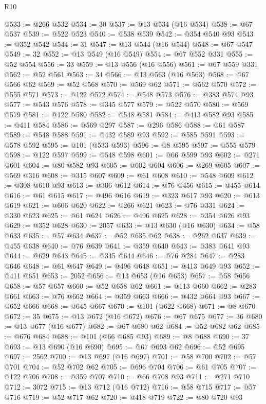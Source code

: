 \begin{lexlean}{R10}
\begin{coremodule}
@533 := @266 @532
@534 := 30
@537 := @13 @534 (@16 @534)
@538 := @67 @537
@539 := @522 @523
@540 := @538 @539
@542 := @354 @540 @93
@543 := @352 @542
@544 := 31
@547 := @13 @544 (@16 @544)
@548 := @67 @547
@549 := 32
@552 := @13 @549 (@16 @549)
@554 := @67 @552 @331
@555 := @52 @554
@556 := 33
@559 := @13 @556 (@16 @556)
@561 := @67 @559 @331
@562 := @52 @561
@563 := 34
@566 := @13 @563 (@16 @563)
@568 := @67 @566 @62
@569 := @52 @568
@570 := @569 @62
@571 := @562 @570
@572 := @555 @571
@573 := @122 @572
@574 := @548 @573
@576 := @383 @574 @93
@577 := @543 @576
@578 := @345 @577
@579 := @522 @570
@580 := @569 @579
@581 := @122 @580
@582 := @548 @581
@584 := @413 @582 @93
@585 := @411 @584
@586 := @569 @297
@587 := @296 @586
@588 := @61 @587
@589 := @548 @588
@591 := @432 @589 @93
@592 := @585 @591
@593 := @578 @592
@595 := @101 (@533 @593)
@596 := @8 @595
@597 := @555 @579
@598 := @122 @597
@599 := @548 @598
@601 := @66 @599 @93
@602 := @271 @601
@604 := @80 @582 @93
@605 := @602 @604
@606 := @269 @605
@607 := @569 @316
@608 := @315 @607
@609 := @61 @608
@610 := @548 @609
@612 := @308 @610 @93
@613 := @306 @612
@614 := @76 @456
@615 := @455 @614
@616 := @61 @615
@617 := @496 @616
@619 := @323 @617 @93
@620 := @613 @619
@621 := @606 @620
@622 := @266 @621
@623 := @76 @331
@624 := @330 @623
@625 := @61 @624
@626 := @496 @625
@628 := @354 @626 @93
@629 := @352 @628
@630 := 2057
@633 := @13 @630 (@16 @630)
@634 := @58 @633
@635 := @57 @634
@637 := @52 @635 @62
@638 := @262 @637
@639 := @455 @638
@640 := @76 @639
@641 := @359 @640
@643 := @383 @641 @93
@644 := @629 @643
@645 := @345 @644
@646 := @76 @284
@647 := @283 @646
@648 := @61 @647
@649 := @496 @648
@651 := @413 @649 @93
@652 := @411 @651
@653 := 2052
@656 := @13 @653 (@16 @653)
@657 := @58 @656
@658 := @57 @657
@660 := @52 @658 @62
@661 := @113 @660
@662 := @283 @661
@663 := @76 @662
@664 := @359 @663
@666 := @432 @664 @93
@667 := @652 @666
@668 := @645 @667
@670 := @101 (@622 @668)
@671 := @8 @670
@672 := 35
@675 := @13 @672 (@16 @672)
@676 := @67 @675
@677 := 36
@680 := @13 @677 (@16 @677)
@682 := @67 @680 @62
@684 := @52 @682 @62
@685 := @676 @684
@688 := @101 (@66 @685 @93)
@689 := @8 @688
@690 := 37
@693 := @13 @690 (@16 @690)
@695 := @67 @693 @62
@696 := @52 @695
@697 := 2562
@700 := @13 @697 (@16 @697)
@701 := @58 @700
@702 := @57 @701
@704 := @52 @702 @62
@705 := @696 @704
@706 := @61 @705
@707 := @122 @706
@708 := @359 @707
@710 := @66 @708 @93
@711 := @271 @710
@712 := 3072
@715 := @13 @712 (@16 @712)
@716 := @58 @715
@717 := @57 @716
@719 := @52 @717 @62
@720 := @418 @719
@722 := @80 @720 @93

\end{coremodule}
\end{lexlean}
